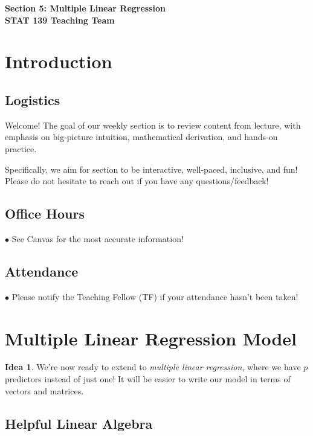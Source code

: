 \documentclass[12pt,oneside]{article}
\theoremstyle{definition}
\newtheorem*{idea}{Idea}
\theoremstyle{remark}
\begin{document}
\pagestyle{fancy}
\begin{center}
\bf \Large
Section 5: Multiple Linear Regression \\[0.5em]
\normalsize
STAT 139 Teaching Team
\end{center}

\section{Introduction}

\subsection{Logistics}

Welcome! The goal of our weekly section is to review content from lecture, with emphasis on big-picture intuition, mathematical derivation, and hands-on practice.

Specifically, we aim for section to be interactive, well-paced, inclusive, and fun! Please do not hesitate to reach out if you have any questions/feedback!

\subsection{Office Hours}

$\bullet$ See Canvas for the most accurate information!

\subsection{Attendance}

$\bullet$ Please notify the Teaching Fellow (TF) if your attendance hasn't been taken!

\section{Multiple Linear Regression Model}

\begin{idea}
We're now ready to extend to \textit{multiple linear regression}, where we have $p$ predictors instead of just one! It will be easier to write our model in terms of vectors and matrices.
\end{idea}

\subsection{Helpful Linear Algebra}
\end{document}
